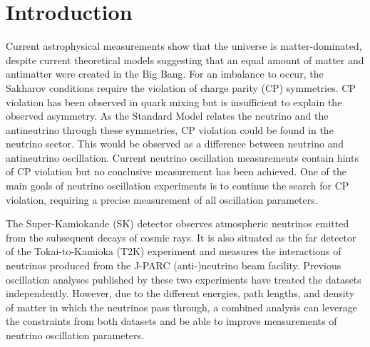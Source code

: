 \chapter{Introduction}
\label{chap:Introduction}

Current astrophysical measurements show that the universe is matter-dominated, despite current theoretical models suggesting that an equal amount of matter and antimatter were created in the Big Bang.
For an imbalance to occur, the Sakharov conditions \cite{Sakharov1991} require the violation of charge parity (CP) symmetries.
CP violation has been observed in quark mixing but is insufficient to explain the observed asymmetry.
As the Standard Model relates the neutrino and the antineutrino through these symmetries, CP violation could be found in the neutrino sector.
This would be observed as a difference between neutrino and antineutrino oscillation.
Current neutrino oscillation measurements contain hints of CP violation \cite{Dunne2020-uf} but no conclusive measurement has been achieved.
One of the main goals of neutrino oscillation experiments is to continue the search for CP violation, requiring a precise measurement of all oscillation parameters.

The Super-Kamiokande (SK) detector observes atmospheric neutrinos emitted from the subsequent decays of cosmic rays. It is also situated as the far detector of the Tokai-to-Kamioka (T2K) experiment and measures the interactions of neutrinos produced from the J-PARC (anti-)neutrino beam facility. Previous oscillation analyses published by these two experiments have treated the datasets independently. However, due to the different energies, path lengths, and density of matter in which the neutrinos pass through, a combined analysis can leverage the constraints from both datasets and be able to improve measurements of neutrino oscillation parameters.

